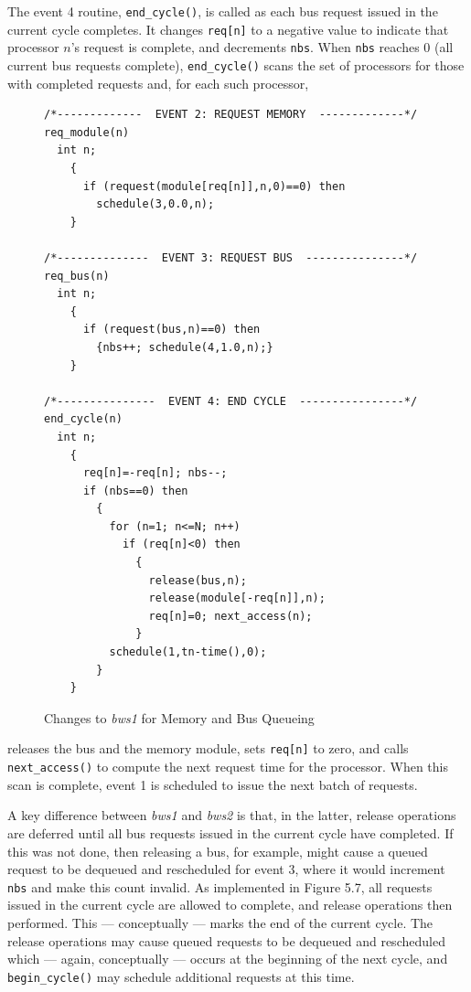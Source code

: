 The event 4 routine, \texttt{end\_cycle()}, is called as each bus request issued in
the current cycle completes. It changes \texttt{req[n]} to a negative value to
indicate that processor $n$'s request is complete, and decrements \texttt{nbs}. When
\texttt{nbs} reaches 0 (all current bus requests complete), \texttt{end\_cycle()} scans the set
of processors for those with completed requests and, for each such processor,
\begin{figure}[H]
\centering
\begin{minipage}{.95\textwidth}
\begin{lstlisting}[basicstyle=\ttfamily\footnotesize]
/*-------------  EVENT 2: REQUEST MEMORY  -------------*/
req_module(n)
  int n;
    {
      if (request(module[req[n]],n,0)==0) then
        schedule(3,0.0,n);
    }

/*--------------  EVENT 3: REQUEST BUS  ---------------*/
req_bus(n)
  int n;
    {
      if (request(bus,n)==0) then
        {nbs++; schedule(4,1.0,n);}
    }

/*---------------  EVENT 4: END CYCLE  ----------------*/
end_cycle(n)
  int n;
    {
      req[n]=-req[n]; nbs--;
      if (nbs==0) then
        {
          for (n=1; n<=N; n++)
            if (req[n]<0) then
              {
                release(bus,n);
                release(module[-req[n]],n);
                req[n]=0; next_access(n);
              }
          schedule(1,tn-time(),0);
        }
    }
\end{lstlisting}
\end{minipage}
\caption{Changes to \emph{bws1} for Memory and Bus Queueing}
\end{figure}
\noindent releases the bus and the memory module, sets \texttt{req[n]} to zero, and calls
\texttt{next\_access()} to compute the next request time for the processor. When
this scan is complete, event 1 is scheduled to issue the next batch of requests.



A key difference between \emph{bws1} and \emph{bws2} is that, in the latter, release
operations are deferred until all bus requests issued in the current cycle have
completed. If this was not done, then releasing a bus, for example, might
cause a queued request to be dequeued and rescheduled for event 3, where it
would increment \texttt{nbs} and make this count invalid. As implemented in
Figure 5.7, all requests issued in the current cycle are allowed to complete,
\noindent and release operations then performed. This --- conceptually --- marks the
end of the current cycle. The release operations may cause queued requests to
be dequeued and rescheduled which --- again, conceptually --- occurs at the
beginning of the next cycle, and \texttt{begin\_cycle()} may schedule additional
requests at this time.

